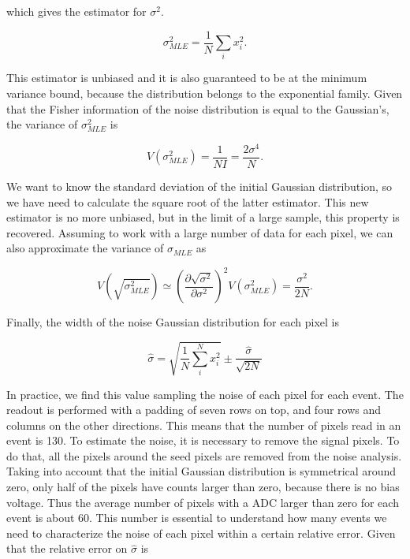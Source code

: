 which gives the estimator for $\sigma^2$.

\begin{equation}
\sigma^2_{MLE} = \frac{1}{N}\sum_ix_i^2.
\end{equation}

This estimator is unbiased and it is also guaranteed to be at the minimum variance bound, because the distribution belongs to the exponential family. Given that the Fisher information of the noise distribution is equal to the Gaussian's, the variance of $\sigma^2_{MLE}$ is

\begin{equation}
V(\sigma^2_{MLE}) = \frac{1}{NI} = \frac{2 \sigma^4}{N}.
\end{equation}

We want to know the standard deviation of the initial Gaussian distribution, so we have need to calculate the square root of the latter estimator. This new estimator is no more unbiased, but in the limit of a large sample, this property is recovered. Assuming to work with a large number of data for each pixel, we can also approximate the variance of $\sigma_{MLE}$ as

\begin{equation}
V(\sqrt{\sigma^2_{MLE}}) \simeq \left( \frac{\partial \sqrt{\sigma^2}}{\partial \sigma^2} \right)^2 V(\sigma^2_{MLE}) = \frac{\sigma^2}{2N}.
\end{equation}

Finally, the width of the noise Gaussian distribution for each pixel is

\begin{equation}
\hat{\sigma} = \sqrt{\frac{1}{N} \sum_i^N x_i^2} \pm \frac{\hat{\sigma}}{\sqrt{2N}}
\end{equation}


In practice, we find this value sampling the noise of each pixel for each event. The readout is performed with a padding of seven rows on top, and four rows and columns on the other directions. This means that the number of pixels read in an event is 130. To estimate the noise, it is necessary to remove the signal pixels. To do that, all the pixels around the seed pixels are removed from the noise analysis. Taking into account that the initial Gaussian distribution is symmetrical around zero, only half of the pixels have counts larger than zero, because there is no bias voltage. Thus the average number of pixels with a ADC larger than zero for each event is about 60. This number is essential to understand how many events we need to characterize the noise of each pixel within a certain relative error. Given that the relative error on $\hat{\sigma}$ is

